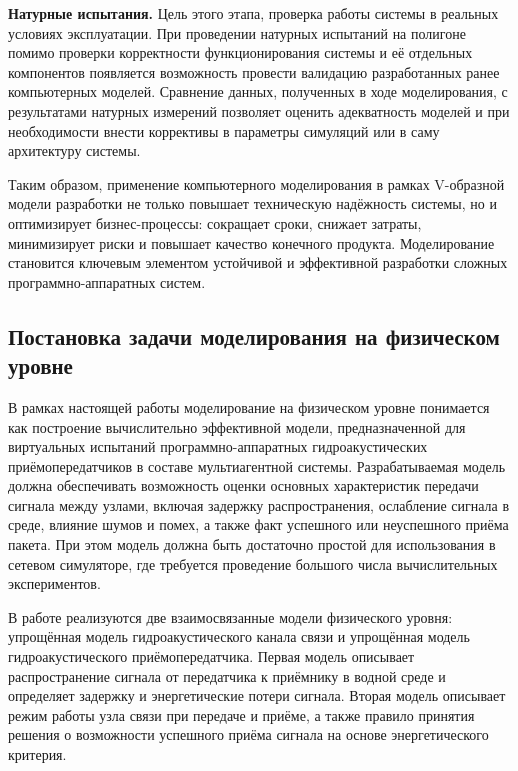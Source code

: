 \documentclass[
    numbers=section,
    document-code={ВКРБ--09.03.04--10.19--XX--26--81}
]{../latex/fqw}
\begin{document}
    \textbf{Натурные испытания.}
    Цель этого этапа, проверка работы системы в реальных условиях эксплуатации.
    При проведении натурных испытаний на полигоне помимо проверки
    корректности функционирования системы и её отдельных компонентов
    появляется возможность провести валидацию разработанных ранее компьютерных моделей.
    Сравнение данных, полученных в ходе моделирования,
    с результатами натурных измерений позволяет оценить адекватность моделей
    и при необходимости внести коррективы в параметры симуляций или в саму архитектуру системы.

    Таким образом, применение компьютерного моделирования в рамках V-образной модели разработки
    не только повышает техническую надёжность системы, но и оптимизирует бизнес-процессы:
    сокращает сроки,
    снижает
    затраты,
    минимизирует риски и
    повышает качество конечного продукта.
    Моделирование становится ключевым элементом
    устойчивой и эффективной разработки сложных программно-аппаратных систем.

    \subsection{Постановка задачи моделирования на физическом уровне}
    \label{subsec:statement_of_modeling_problem_at_physical_level}

    В рамках настоящей работы моделирование на физическом уровне понимается
    как построение вычислительно эффективной модели,
    предназначенной для виртуальных испытаний программно-аппаратных гидроакустических приёмопередатчиков
    в составе мультиагентной системы.
    Разрабатываемая модель должна обеспечивать возможность оценки основных характеристик передачи сигнала между узлами,
    включая задержку распространения, ослабление сигнала в среде, влияние шумов и помех,
    а также факт успешного или неуспешного приёма пакета.
    При этом модель должна быть достаточно простой для использования в сетевом симуляторе,
    где требуется проведение большого числа вычислительных экспериментов.

    В работе реализуются две взаимосвязанные модели физического уровня:
    упрощённая модель гидроакустического канала связи и упрощённая модель гидроакустического приёмопередатчика.
    Первая модель описывает распространение сигнала от передатчика к приёмнику в водной среде и
    определяет задержку и энергетические потери сигнала.
    Вторая модель описывает режим работы узла связи при передаче и приёме,
    а также правило принятия решения о возможности успешного приёма сигнала на основе энергетического критерия.
\end{document}

